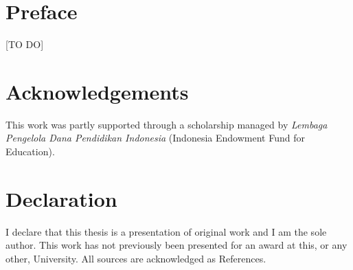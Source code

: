 \documentclass[11pt, a4paper]{report} \usepackage[titletoc]{appendix}
\begin{document}
\cleardoublepage
\listoftables
{}

\cleardoublepage
\lstlistoflistings
{}

\cleardoublepage
\chapter*{Preface}
\textsf{[TO DO]}

\cleardoublepage
\chapter*{Acknowledgements}
This work was partly supported through a scholarship managed by 
\emph{Lembaga Pengelola Dana Pendidikan Indonesia}
(Indonesia Endowment Fund for Education).

\cleardoublepage
\chapter*{Declaration}
I declare that this thesis is a presentation of original work and 
I am the sole author. This work has not previously been presented 
for an award at this, or any other, University. All sources are 
acknowledged as References.

\cleardoublepage









\begin{appendices}

\end{appendices}



\cleardoublepage
{}


\end{document}
